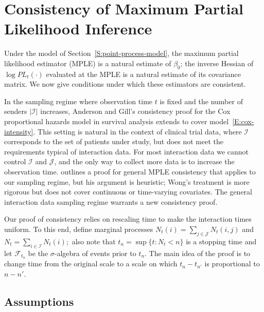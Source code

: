 \documentclass[final]{statsoc}
\begin{document}
\section{Consistency of Maximum Partial Likelihood Inference}
\label{S:MPLE-consistency}

Under the model of Section~\ref{S:point-process-model}, the maximum partial likelihood estimator (MPLE) is a natural
estimate of $\beta_0$; the inverse Hessian of $\log \mathit{PL}_t(\cdot)$
evaluated at the MPLE is a natural estimate of its covariance matrix.
We now give conditions under which these
estimators are consistent.

In the sampling regime where observation time $t$ is fixed and the number of
senders $|\mathcal{I}|$ increases, Anderson and Gill's \citeyearpar{andersen1982cox} consistency proof for
the Cox proportional hazards model in survival analysis extends
to cover model~\eqref{E:cox-intensity}.  This setting is natural in the
context of clinical trial data, where $\mathcal{I}$ corresponds to the set of
patients under study, but does not meet the requirements typical of
interaction data.  For most interaction
data we cannot control $\mathcal{I}$ and $\mathcal{J}$, and the only way to
collect more data is to increase the observation time.  \citet{cox1972regression,cox1975partial} outlines a proof for general
MPLE consistency that applies to our sampling regime, but his argument is
heuristic; Wong's \citeyearpar{wong1986theory} treatment is more rigorous but does not cover continuous or
time-varying covariates. The general
interaction data sampling regime warrants a new consistency proof.

Our proof of consistency relies on rescaling time to make the interaction
times uniform.  To this end, define marginal processes
\(
    N_t(i) = \sum_{j \in \mathcal{J}} N_t(i,j)
\)
and
\(
    N_t = \sum_{i \in \mathcal{I}} N_t(i);
\)
also note that $t_n = \sup\{ t : N_t < n \}$ is a stopping time
and let $\mathcal{F}_{t_n}$ be the $\sigma$-algebra of events prior to
$t_n$. The main idea of the proof is to change time from the original scale
to a scale on which $t_{n} - t_{n'}$ is proportional to $n - n'$.

\subsection{Assumptions}
\end{document}
